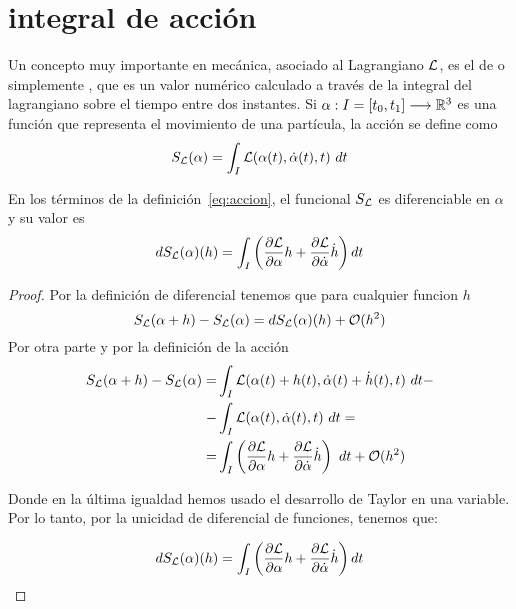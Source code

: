 \section{integral de acción}\label{sec:integral-de-accion}

Un concepto muy importante en mecánica, asociado al Lagrangiano $\mathcal{L}$, es el de  o simplemente , que es un valor numérico calculado a través de la integral del lagrangiano sobre el tiempo entre dos instantes.
Si $\alpha:I=[t_0, t_1]\longrightarrow \mathbb{R}^3$ es una función que representa el movimiento de una partícula, la acción se define como
\begin{equation}
	\label{eq:accion}
	S_{\mathcal{L}}(\alpha) = \int_{I}\mathcal{L}(\alpha(t), \dot{\alpha}(t), t)\ dt
\end{equation}

\begin{proposition}
	En los términos de la definición~\eqref{eq:accion}, el funcional $S_{\mathcal{L}}$ es diferenciable en $\alpha$ y su valor es
	\begin{equation}
		\label{eq:accion_diferencial}
		dS_{\mathcal{L}}(\alpha)(h)=\int_{I}\left( \frac{\partial \mathcal{L}}{\partial\alpha}h+\frac{\partial \mathcal{L}}{\partial\dot{\alpha}}\dot{h}\right) dt
	\end{equation}
\end{proposition}
\begin{proof}
	Por la definición de diferencial tenemos que para cualquier funcion $h$
	\begin{equation*}
		S_{\mathcal{L}}(\alpha + h) -  S_{\mathcal{L}}(\alpha) = dS_{\mathcal{L}}(\alpha)(h) +\mathcal{O}(h^2)
	\end{equation*}
	Por otra parte y por la definición de la acción
	\begin{equation*}
		\begin{split}
			S_\lagrangiano(\alpha + h) -  S_\lagrangiano(\alpha) = & \int_{I}\lagrangiano(\alpha(t)+h(t), \dot{\alpha}(t)+\dot{h}(t), t)\ dt - \\
			- & \int_{I}\lagrangiano(\alpha(t), \dot{\alpha}(t), t)\ dt =\\
			=& \int_{I}\left( \frac{\partial \lagrangiano}{\partial\alpha}h+\frac{\partial \lagrangiano}{\partial\dot{\alpha}}\dot{h}\right)\ dt+\mathcal{O}(h^2)
		\end{split}
	\end{equation*}

	Donde en la última igualdad hemos usado el desarrollo de Taylor en una variable.
	Por lo tanto, por la unicidad de diferencial de funciones, tenemos que:

	\begin{equation*}
		dS_{\mathcal{L}}(\alpha)(h) =\int_{I}\left( \frac{\partial \mathcal{L}}{\partial\alpha}h+\frac{\partial \mathcal{L}}{\partial\dot{\alpha}}\dot{h}\right) dt
	\end{equation*}

\end{proof}


